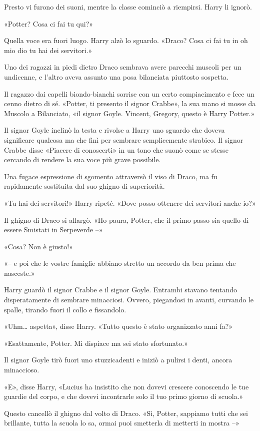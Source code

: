 Presto vi furono dei suoni, mentre la classe cominciò a riempirsi. Harry li ignorò.

«Potter? Cosa ci fai tu qui?»

Quella voce era fuori luogo. Harry alzò lo sguardo. «Draco? Cosa ci fai tu in oh mio dio tu hai dei servitori.»

Uno dei ragazzi in piedi dietro Draco sembrava avere parecchi muscoli per un undicenne, e l’altro aveva assunto una posa bilanciata piuttosto sospetta.

Il ragazzo dai capelli biondo-bianchi sorrise con un certo compiacimento e fece un cenno dietro di sé. «Potter, ti presento il signor Crabbe», la sua mano si mosse da Muscolo a Bilanciato, «il signor Goyle. Vincent, Gregory, questo è Harry Potter.»

Il signor Goyle inclinò la testa e rivolse a Harry uno sguardo che doveva significare qualcosa ma che finì per sembrare semplicemente strabico. Il signor Crabbe disse «Piacere di conoscerti» in un tono che suonò come se stesse cercando di rendere la sua voce più grave possibile.

Una fugace espressione di sgomento attraversò il viso di Draco, ma fu rapidamente sostituita dal suo ghigno di superiorità.

«Tu hai dei servitori!» Harry ripeté. «Dove posso ottenere dei servitori anche io?»

Il ghigno di Draco si allargò. «Ho paura, Potter, che il primo passo sia quello di essere Smistati in Serpeverde –»

«Cosa? Non è giusto!»

«– e poi che le vostre famiglie abbiano stretto un accordo da ben prima che nasceste.»

Harry guardò il signor Crabbe e il signor Goyle. Entrambi stavano tentando disperatamente di sembrare minacciosi. Ovvero, piegandosi in avanti, curvando le spalle, tirando fuori il collo e fissandolo.

«Uhm… aspetta», disse Harry. «Tutto questo è stato organizzato anni fa?»

«Esattamente, Potter. Mi dispiace ma sei stato sfortunato.»

Il signor Goyle tirò fuori uno stuzzicadenti e iniziò a pulirsi i denti, ancora minaccioso.

«E», disse Harry, «Lucius ha insistito che non dovevi crescere conoscendo le tue guardie del corpo, e che dovevi incontrarle solo il tuo primo giorno di scuola.»

Questo cancellò il ghigno dal volto di Draco. «Sì, Potter, sappiamo tutti che sei brillante, tutta la scuola lo sa, ormai puoi smetterla di metterti in mostra –»

